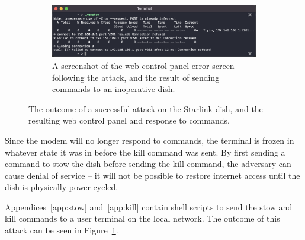 \begin{figure}
\begin{subfigure}{.52011\textwidth}
        \centering\includegraphics[width=\textwidth]{img/unstow.png}
        \caption{A screenshot of the web control panel error screen following the attack, and the result of sending commands to an inoperative dish.}
    \end{subfigure}
\caption{The outcome of a successful attack on the Starlink dish, and the resulting web control panel and response to commands.}
\label{fig:attack-outcome}
\vspace{-1.5em}
\end{figure}

Since the modem will no longer respond to commands, the terminal is frozen in whatever state it was in before the kill command was sent.
By first sending a command to stow the dish before sending the kill command, the adversary can cause denial of service -- it will not be possible to restore internet access until the dish is physically power-cycled.

Appendices~\ref{app:stow} and~\ref{app:kill} contain shell scripts to send the stow and kill commands to a user terminal on the local network.
The outcome of this attack can be seen in Figure~\ref{fig:attack-outcome}.
